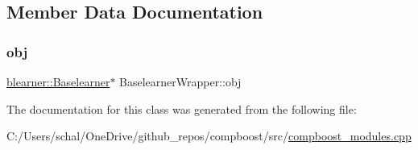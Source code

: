 \subsection{Member Data Documentation}
\mbox{\label{class_baselearner_wrapper_a4c0fc84b4a0d10d9353a263fbec92d22}} 
\subsubsection{\texorpdfstring{obj}{obj}}
{\footnotesize\ttfamily \mbox{\hyperlink{classblearner_1_1_baselearner}{blearner\+::\+Baselearner}}$\ast$ Baselearner\+Wrapper\+::obj\hspace{0.3cm}{\ttfamily [protected]}}



The documentation for this class was generated from the following file\+:\begin{DoxyCompactItemize}
\item 
C\+:/\+Users/schal/\+One\+Drive/github\+\_\+repos/compboost/src/\mbox{\hyperlink{compboost__modules_8cpp}{compboost\+\_\+modules.\+cpp}}\end{DoxyCompactItemize}
